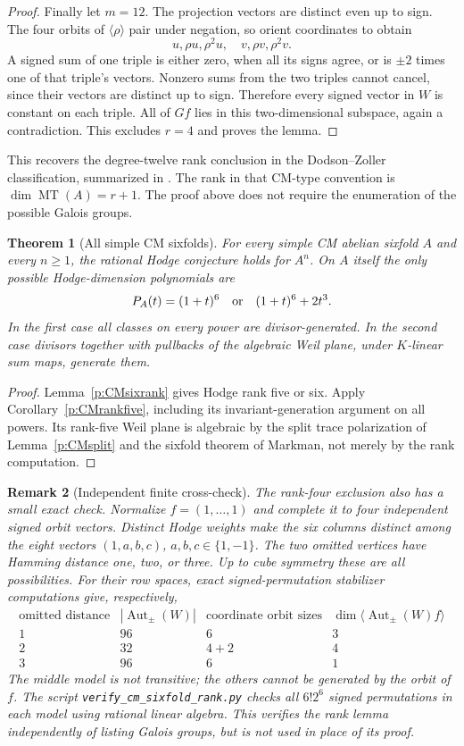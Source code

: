 \documentclass[11pt,reqno]{article}
\theoremstyle{emphasizedplain}
\newtheorem{theorem}{Theorem}[section]
\theoremstyle{emphasizeddefinition}
\theoremstyle{emphasizeddefinition}
\newtheorem{remark}[theorem]{Remark}
\DeclareMathOperator{\MT}{MT}
\begin{document}
\begin{proof}
Finally let $m=12$. The projection vectors are distinct even up to
sign. The four orbits of $\langle\rho\rangle$ pair under negation,
so orient coordinates to obtain
\[
 u,\rho u,\rho^2u,\quad v,\rho v,\rho^2v.
\]
A signed sum of one triple is either zero, when all its signs agree,
or is $\pm2$ times one of that triple's vectors. Nonzero sums from
the two triples cannot cancel, since their vectors are distinct up
to sign. Therefore every signed vector in $W$ is constant on each
triple. All of $Gf$ lies in this two-dimensional subspace, again a
contradiction. This excludes $r=4$ and proves the lemma.
\end{proof}
This recovers the degree-twelve rank conclusion in the Dodson--Zoller
classification, summarized in \cite[\S2.2.2]{Borselli}. The rank in
that CM-type convention is $\dim\MT(A)=r+1$. The proof above does
not require the enumeration of the possible Galois groups.

\begin{theorem}[All simple CM sixfolds]\label{p:CMcomplete}
For every simple CM abelian sixfold $A$ and every $n\ge1$, the
rational Hodge conjecture holds for $A^n$.
On $A$ itself the only possible Hodge-dimension polynomials are
\[
 P_A(t)=(1+t)^6\quad\hbox{or}\quad (1+t)^6+2t^3.
\]
In the first case all classes on every power are divisor-generated.
In the second case divisors together with pullbacks of the algebraic
Weil plane, under $K$-linear sum maps, generate them.
\end{theorem}
\begin{proof}
Lemma~\ref{p:CMsixrank} gives Hodge rank five or six. Apply
Corollary~\ref{p:CMrankfive}, including its invariant-generation
argument on all powers. Its rank-five Weil plane is algebraic by
the split trace polarization of Lemma~\ref{p:CMsplit} and the
sixfold theorem of Markman, not merely by the rank computation.
\end{proof}

\begin{remark}[Independent finite cross-check]
The rank-four exclusion also has a small exact check. Normalize
$f=(1,\ldots,1)$ and complete it to four independent signed orbit
vectors. Distinct Hodge weights make the six columns distinct among
the eight vectors $(1,a,b,c)$, $a,b,c\in\{1,-1\}$. The two omitted
vertices have Hamming distance one, two, or three. Up to cube
symmetry these are all possibilities. For their row spaces, exact
signed-permutation stabilizer computations give, respectively,
\[
\begin{array}{c|c|c|c}
\text{omitted distance}&|\operatorname{Aut}_{\pm}(W)|&
 \text{coordinate orbit sizes}&
 \dim\langle\operatorname{Aut}_{\pm}(W)f\rangle\\\hline
1&96&6&3\\
2&32&4+2&4\\
3&96&6&1
\end{array}
\]
The middle model is not transitive; the others cannot be generated
by the orbit of $f$. The script \texttt{verify\_cm\_sixfold\_rank.py}
checks all $6!2^6$ signed permutations in each model using rational
linear algebra. This verifies the rank lemma independently of
listing Galois groups, but is not used in place of its proof.
\end{remark}
\end{document}
